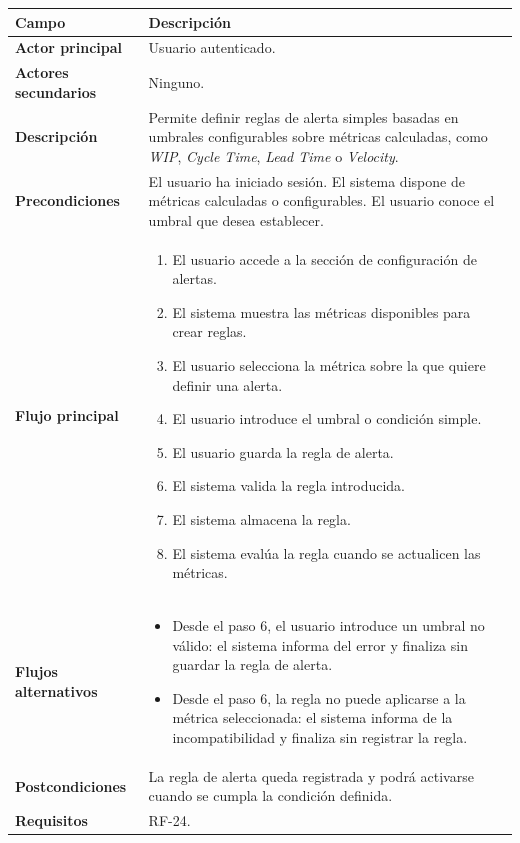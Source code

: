 {\renewcommand{\arraystretch}{1.25}\footnotesize
\begin{longtable}{p{3.2cm}p{10.2cm}}
\toprule
\textbf{Campo} & \textbf{Descripción} \\
\midrule
\textbf{Actor principal} & Usuario autenticado. \\
\textbf{Actores secundarios} & Ninguno. \\
\textbf{Descripción} & Permite definir reglas de alerta simples basadas en umbrales configurables sobre métricas calculadas, como \textit{WIP}, \textit{Cycle Time}, \textit{Lead Time} o \textit{Velocity}. \\
\textbf{Precondiciones} & El usuario ha iniciado sesión. El sistema dispone de métricas calculadas o configurables. El usuario conoce el umbral que desea establecer. \\
\textbf{Flujo principal} & \begin{minipage}[t]{10.2cm}\begin{enumerate}[noitemsep,leftmargin=*]
    \item El usuario accede a la sección de configuración de alertas.
    \item El sistema muestra las métricas disponibles para crear reglas.
    \item El usuario selecciona la métrica sobre la que quiere definir una alerta.
    \item El usuario introduce el umbral o condición simple.
    \item El usuario guarda la regla de alerta.
    \item El sistema valida la regla introducida.
    \item El sistema almacena la regla.
    \item El sistema evalúa la regla cuando se actualicen las métricas.
\end{enumerate}\end{minipage} \\
\textbf{Flujos alternativos} & \begin{minipage}[t]{10.2cm}\begin{itemize}[noitemsep,leftmargin=*]
    \item Desde el paso 6, el usuario introduce un umbral no válido: el sistema informa del error y finaliza sin guardar la regla de alerta.
    \item Desde el paso 6, la regla no puede aplicarse a la métrica seleccionada: el sistema informa de la incompatibilidad y finaliza sin registrar la regla.
\end{itemize}\end{minipage} \\
\textbf{Postcondiciones} & La regla de alerta queda registrada y podrá activarse cuando se cumpla la condición definida. \\
\textbf{Requisitos} & RF-24. \\
\bottomrule
\end{longtable}
\vspace{0.45em}
}

